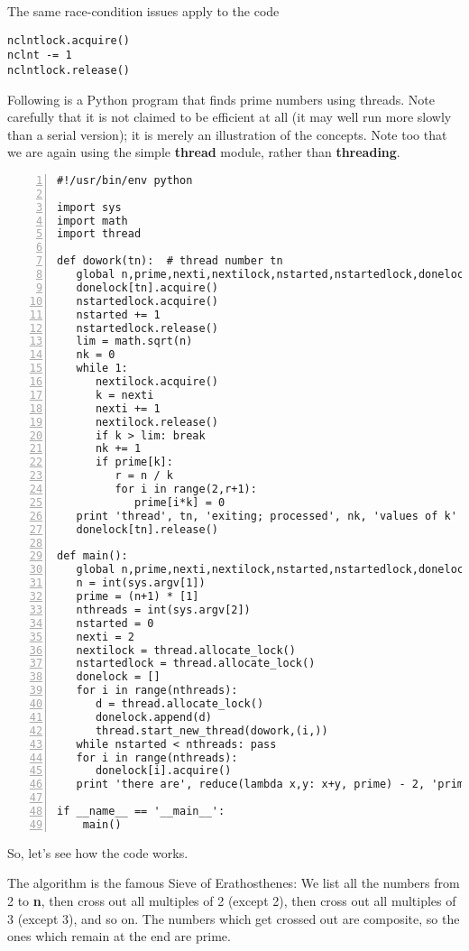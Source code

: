 The same race-condition issues apply to the code

\begin{Verbatim}[fontsize=\relsize{-2}]
nclntlock.acquire()
nclnt -= 1
nclntlock.release()
\end{Verbatim}

Following is a Python program that finds prime numbers using threads.
Note carefully that it is not claimed to be efficient at all (it may
well run more slowly than a serial version); it is merely an
illustration of the concepts.  Note too that we are again using the
simple {\bf thread} module, rather than {\bf threading}.

\begin{Verbatim}[fontsize=\relsize{-2},numbers=left]
#!/usr/bin/env python

import sys
import math
import thread

def dowork(tn):  # thread number tn
   global n,prime,nexti,nextilock,nstarted,nstartedlock,donelock
   donelock[tn].acquire()
   nstartedlock.acquire()
   nstarted += 1
   nstartedlock.release()
   lim = math.sqrt(n)
   nk = 0
   while 1:
      nextilock.acquire()
      k = nexti
      nexti += 1
      nextilock.release()
      if k > lim: break
      nk += 1
      if prime[k]:
         r = n / k
         for i in range(2,r+1):
            prime[i*k] = 0
   print 'thread', tn, 'exiting; processed', nk, 'values of k'
   donelock[tn].release()

def main():
   global n,prime,nexti,nextilock,nstarted,nstartedlock,donelock
   n = int(sys.argv[1])
   prime = (n+1) * [1]
   nthreads = int(sys.argv[2])
   nstarted = 0
   nexti = 2
   nextilock = thread.allocate_lock()  
   nstartedlock = thread.allocate_lock()  
   donelock = []
   for i in range(nthreads):
      d = thread.allocate_lock()  
      donelock.append(d) 
      thread.start_new_thread(dowork,(i,))
   while nstarted < nthreads: pass
   for i in range(nthreads):
      donelock[i].acquire()  
   print 'there are', reduce(lambda x,y: x+y, prime) - 2, 'primes'

if __name__ == '__main__':
    main()
\end{Verbatim}

So, let's see how the code works.

The algorithm is the famous Sieve of Erathosthenes:  We list all the
numbers from 2 to {\bf n}, then cross out all multiples of 2 (except 2),
then cross out all multiples of 3 (except 3), and so on.  The numbers
which get crossed out are composite, so the ones which remain at the end
are prime.

